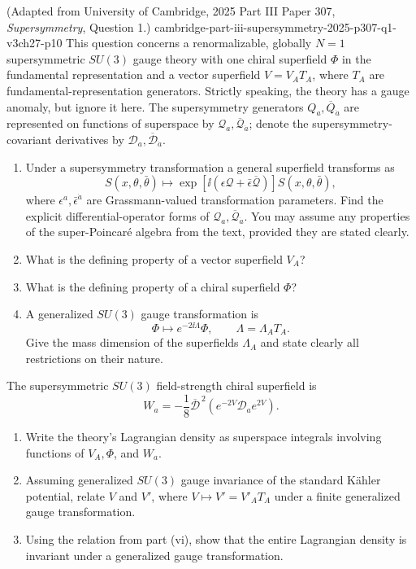 \begin{enumerate}
    {(Adapted from University of Cambridge, 2025 Part III Paper 307, \emph{Supersymmetry}, Question 1.)}
    {cambridge-part-iii-supersymmetry-2025-p307-q1-v3ch27-p10}
This question concerns a renormalizable, globally \(N=1\) supersymmetric
  \(SU(3)\) gauge theory with one chiral superfield \(\Phi\) in the
  fundamental representation and a vector superfield \(V=V_AT_A\), where
  \(T_A\) are fundamental-representation generators.  Strictly speaking,
  the theory has a gauge anomaly, but ignore it here.  The supersymmetry
  generators \(Q_a,\overline Q_{\dot a}\) are represented on functions of
  superspace by \(\mathcal Q_a,\overline{\mathcal Q}_{\dot a}\); denote the
  supersymmetry-covariant derivatives by
  \(\mathcal D_a,\overline{\mathcal D}_{\dot a}\).
  \begin{enumerate}
    \item[(i)] Under a supersymmetry transformation a general superfield
      transforms as
      \[
        S(x,\theta,\bar\theta)\longmapsto
          \exp\!\left[\ii(\epsilon\mathcal Q
                       +\bar\epsilon\overline{\mathcal Q})\right]
          S(x,\theta,\bar\theta),
      \]
      where \(\epsilon^a,\bar\epsilon^{\dot a}\) are Grassmann-valued
      transformation parameters.  Find the explicit differential-operator
      forms of \(\mathcal Q_a,\overline{\mathcal Q}_{\dot a}\).  You may
      assume any properties of the super-Poincar\'e algebra from the text,
      provided they are stated clearly.
    \item[(ii)] What is the defining property of a vector superfield \(V_A\)?
    \item[(iii)] What is the defining property of a chiral superfield
      \(\Phi\)?
    \item[(iv)] A generalized \(SU(3)\) gauge transformation is
      \[
        \Phi\longmapsto e^{-2\ii\Lambda}\Phi,
        \qquad \Lambda=\Lambda_AT_A.
      \]
      Give the mass dimension of the superfields \(\Lambda_A\) and state
      clearly all restrictions on their nature.
  \end{enumerate}
  The supersymmetric \(SU(3)\) field-strength chiral superfield is
  \[
    W_a=-\frac18\overline{\mathcal D}^{\,2}
      \left(e^{-2V}\mathcal D_a e^{2V}\right).
  \]
  \begin{enumerate}
    \item[(v)] Write the theory's Lagrangian density as superspace integrals
      involving functions of \(V_A,\Phi\), and \(W_a\).
    \item[(vi)] Assuming generalized \(SU(3)\) gauge invariance of the
      standard K\"ahler potential, relate \(V\) and \(V'\), where
      \(V\mapsto V'=V'_AT_A\) under a finite generalized gauge
      transformation.
    \item[(vii)] Using the relation from part (vi), show that the entire
      Lagrangian density is invariant under a generalized gauge
      transformation.
  \end{enumerate}


\end{enumerate}
